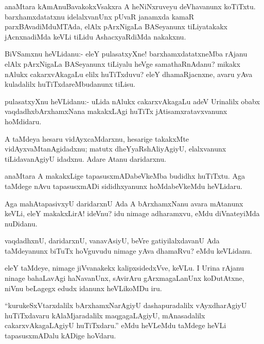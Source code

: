 \documentclass{article}
\begin{document}
\begin{mn}
anaMtara kAmAnuBavakokxVsakxra A heNiNxruveyu deVhavanunx
koTiTxtu. barxhamxdatatxnu idelalxvanUnx pUvaR janamxda kamaR
parxBAvadiMduMTAda, elAlx pArxNigaLa BASeyanunx tiLiyatakakx
jAcnxnadiMda keVLi tiLidu AshacxyaRdiMda nakakxnu.
\end{mn}

\begin{mn}%
BiVSamxnu heVLidanu:- eleY pulasatxyXne! barxhamxdatatxneMba rAjanu
elAlx pArxNigaLa BASeyanunx tiLiyalu heVge samathaRnAdanu? mikakx
nAlukx cakarxvAkagaLu elilx huTiTxduvu? eleY dhamaRjacnxne, avaru yAva
kuladalilx huTiTxdareMbudanunx tiLisu.
\end{mn}

\begin{mn}%
pulasatxyXnu heVLidanu:- uLida nAlukx cakarxvAkagaLu adeV Urinalilx
obabx vaqdadhxbArxhamxNana makakxLAgi huTiTx jAtisamxratavxvanunx hoMdidaru.
\end{mn}

\begin{mn}
A taMdeya hesaru vidAyxcaMdarxnu, hesarige takakxMte
vidAyxvaMtanAgidadxnu; matutx dheYyaRshAliyAgiyU, elalxvanunx
tiLidavanAgiyU idadxnu. Adare Atanu daridarxnu.
\end{mn}

\begin{mn}
anaMtara A makakxLige tapasusxmADabeVkeMba budidhx huTiTxtu. Aga
taMdege nAvu tapasusxmADi sididhxyanunx hoMdabeVkeMdu heVLidaru.
\end{mn}

\begin{mn}%
Aga mahAtapasivxyU daridarxnU Ada A bArxhamxNanu avara mAtanunx keVLi,
eleY makakxLirA! ideVnu? idu nimage adharamxvu, eMdu diVnateyiMda nuDidanu.
\end{mn}

\begin{mn}
vaqdadhxnU, daridarxnU, vanavAsiyU, beVre gatiyilalxdavanU Ada
taMdeyanunx biTuTx hoVguvudu nimage yAva dhamaRvu? eMdu keVLidanu.
\end{mn}

\begin{mn}%
eleY taMdeye, nimage jiVvanakekx kalipxsidedxVve, keVLu. I Urina
rAjanu ninage bahaLavAgi haNavanUnx, sAvirAru gArxmagaLanUnx
koDutAtxne, niVnu beLagegx edudx idanunx heVLikoMDu iru.
\end{mn}

\begin{mn}
``kurukeSxVtarxdalilx bArxhamxNarAgiyU dashapuradalilx vAyxdharAgiyU
  huTiTxdavaru kAlaMjaradalilx maqgagaLAgiyU, mAnasadalilx
  cakarxvAkagaLAgiyU huTiTxdaru.'' eMdu heVLeMdu taMdege heVLi
  tapasusxmADalu kADige hoVdaru.
\end{mn}
\end{document}
